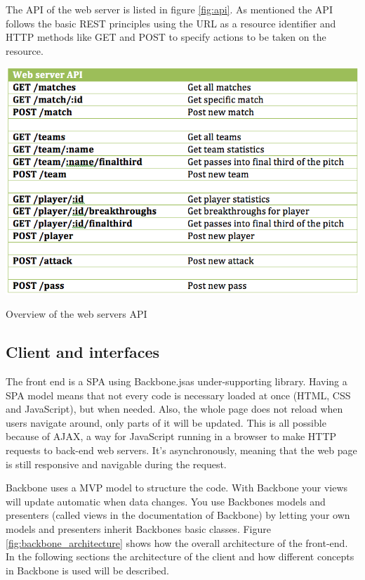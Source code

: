 The \ac{API} of the web server is listed in figure \ref{fig:api}. As mentioned the \ac{API} follows the basic \ac{REST} principles using the URL as a resource identifier and HTTP methods like GET and POST to specify actions to be taken on the resource.

\begin{table}[ht!]
\centering
\includegraphics[width=1\textwidth]{images/implementation/API.png}
\caption{Overview of the web servers API}
\label{fig:api}
\end{table}

\subsection{Client and interfaces}

The front end is a \ac{SPA} using Backbone.js\footnotemark as under-supporting library. Having a \ac{SPA} model means that not every code is necessary loaded at once (\ac{HTML}, \ac{CSS} and JavaScript), but when needed. Also, the whole page does not reload when users navigate around, only parts of it will be updated. This is all possible because of \ac{AJAX}, a way for JavaScript running in a browser to make HTTP requests to back-end web servers. It’s asynchronously, meaning that the web page is still responsive and navigable during the request\cite{ajax}.

Backbone uses a \ac{MVP} model to structure the code. With Backbone your views will update automatic when data changes. You use Backbones models and presenters (called views in the documentation of Backbone) by letting your own models and presenters inherit Backbones basic classes. Figure \ref{fig:backbone_architecture} shows how the overall architecture of the front-end. In the following sections the architecture of the client and how different concepts in Backbone is used will be described. 

